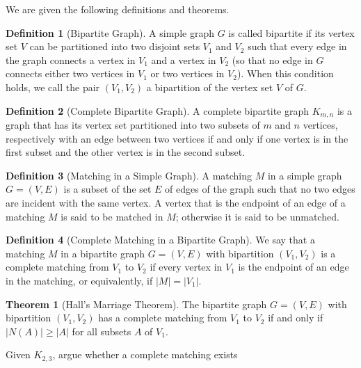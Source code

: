 \documentclass[addpoints]{exam}
\theoremstyle{definition}
\newtheorem{definition}{Definition}[section]
\newtheorem{theorem}{Theorem}
\theoremstyle{claim}
\begin{document}
\begin{questions}
\question We are given the following definitions and theorems.

\begin{definition}[Bipartite Graph]
A simple graph $G$ is called bipartite if its vertex set $V$ can be partitioned into two disjoint sets $V_1$ and $V_2$ such that every edge in the graph connects a vertex in $V_1$ and a vertex in $V_2$ (so that no edge in $G$ connects either two vertices in $V_1$ or two vertices in $V_2$). When this condition holds, we call the pair $(V_1, V_2)$ a bipartition of the vertex set $V$ of $G$.
\end{definition}

\begin{definition}[Complete Bipartite Graph]
A complete bipartite graph $K_{m,n}$ is a graph that has its vertex set partitioned into two subsets of $m$ and $n$ vertices, respectively with an edge between two vertices if and only if one vertex is in the first subset and the other vertex is in the second subset.
\end{definition}

\begin{definition}[Matching in a Simple Graph]
 A matching $M$ in a simple graph $G = (V, E)$ is a subset of the set $E$ of edges of the graph such that no two edges are incident with the same vertex.  A vertex that is the endpoint of an edge of a matching $M$ is said to be matched in $M$; otherwise it is said to be unmatched.
\end{definition}

\begin{definition}[Complete Matching in a Bipartite Graph]
We say that a matching $M$ in a bipartite graph $G = (V, E)$ with bipartition $(V_1,V_2)$ is a complete matching from $V_1$ to $V_2$ if every vertex in $V_1$ is the endpoint of an edge in the matching, or equivalently, if $|M| = |V_1|$.
\end{definition}

\begin{theorem}[Hall’s Marriage Theorem]
  The bipartite graph $G = (V, E)$ with bipartition $(V_1, V_2)$ has a complete matching from $V_1$ to $V_2$ if and only if $|N(A)| \geq |A|$ for all subsets $A$ of $V_1$.
\end{theorem}

Given $K_{2,3}$, argue whether a complete matching exists
\begin{parts}

\end{parts}
\end{questions}
\end{document}
